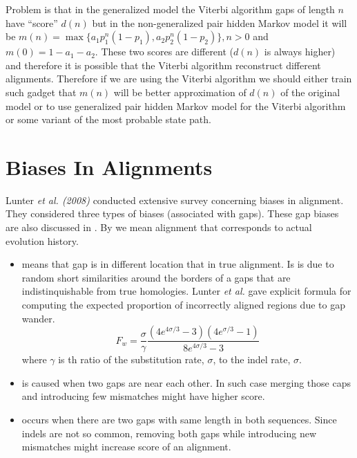 Problem is that in the generalized model the Viterbi algorithm gaps of length
$n$ have ``score'' $d(n)$ but in the non-generalized pair hidden Markov model it
will be $m(n)=\max\{a_1p_1^n(1-p_1),a_2p_2^n(1-p_2)\}, n>0$ and
$m(0)=1-a_1-a_2$.  These two scores are different ($d(n)$ is always higher) and
therefore it is possible that the Viterbi algorithm reconstruct different
alignments. Therefore if we are using the Viterbi algorithm we should either
train such gadget that $m(n)$ will be better approximation of $d(n)$ of the
original model or to use generalized pair hidden Markov model for the Viterbi
algorithm or some variant of the most probable state path.




\section{Biases In Alignments}

Lunter {\it et al. (2008)} conducted extensive survey concerning biases in
alignment. They considered three types of biases (associated with gaps). These
gap biases are also discussed in \cite{Durbin1998} . By
 we mean alignment that corresponds to actual 
evolution history.
\begin{itemize}
\item {} means that gap is in different location that in
true alignment. Is is due to random short similarities around the borders of
a gaps that are indistinquishable from true homologies. Lunter {\it et al.} gave
explicit formula for computing the expected proportion of incorrectly aligned
regions due to gap wander. 
\[F_w =
\frac{\sigma}{\gamma}\frac{(4e^{4\sigma/3}-3)(4e^{\sigma/3}-1)}{8e^{4\sigma/3}-3}\]
where $\gamma$ is th ratio of the substitution rate, $\sigma$, to the indel
rate, $\sigma$.

\item {} is caused when two gaps are near each other.
In such case merging those caps and introducing few mismatches might have higher
score. 
\item {} occurs when there are two gaps with
same length in both sequences. Since indels are not so common, removing both
gaps while introducing new mismatches might increase score of an alignment.
\end{itemize}

